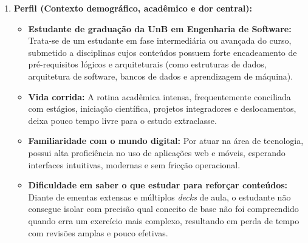 \begin{enumerate}
    \item \textbf{Perfil (Contexto demográfico, acadêmico e dor central):}
    \begin{itemize}
        \item \textbf{Estudante de graduação da UnB em Engenharia de Software:} Trata-se de um estudante em fase intermediária ou avançada do curso, submetido a disciplinas cujos conteúdos possuem forte encadeamento de pré-requisitos lógicos e arquiteturais (como estruturas de dados, arquitetura de software, bancos de dados e aprendizagem de máquina).
        \item \textbf{Vida corrida:} A rotina acadêmica intensa, frequentemente conciliada com estágios, iniciação científica, projetos integradores e deslocamentos, deixa pouco tempo livre para o estudo extraclasse.
        \item \textbf{Familiaridade com o mundo digital:} Por atuar na área de tecnologia, possui alta proficiência no uso de aplicações web e móveis, esperando interfaces intuitivas, modernas e sem fricção operacional.
        \item \textbf{Dificuldade em saber o que estudar para reforçar conteúdos:} Diante de ementas extensas e múltiplos \textit{decks} de aula, o estudante não consegue isolar com precisão qual conceito de base não foi compreendido quando erra um exercício mais complexo, resultando em perda de tempo com revisões amplas e pouco efetivas.
    \end{itemize}


\end{enumerate}
